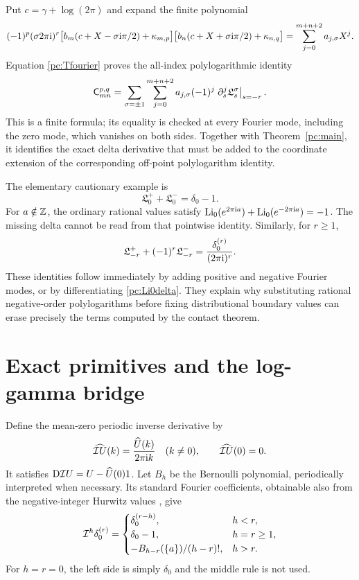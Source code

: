 Put $c=\gamma+\log(2\pi)$ and expand the finite polynomial
\begin{equation}\label{pc:polylogpolynomial}
 (-1)^p(\sigma2\pi\mathrm{i})^r
 \bigl[b_m(c+X-\sigma\mathrm{i}\pi/2)+\kappa_{m,p}\bigr]
 \bigl[b_n(c+X+\sigma\mathrm{i}\pi/2)+\kappa_{n,q}\bigr]
 =\sum_{j=0}^{m+n+2}a_{j,\sigma}X^j.
\end{equation}
Equation \eqref{pc:Tfourier} proves the all-index polylogarithmic identity
\begin{equation}\label{pc:polylogidentity}
 \mathsf C_{mn}^{p,q}=
 \sum_{\sigma=\pm1}\sum_{j=0}^{m+n+2}
 a_{j,\sigma}(-1)^j
 \left.\partial_s^j\mathfrak L_s^\sigma\right|_{s=-r}.
\end{equation}
This is a finite formula; its equality is checked at every Fourier mode, including the zero mode, which vanishes on both sides. Together with Theorem~\ref{pc:main}, it identifies the exact delta derivative that must be added to the coordinate extension of the corresponding off-point polylogarithm identity.

The elementary cautionary example is
\begin{equation}\label{pc:Li0delta}
 \mathfrak L_0^++\mathfrak L_0^-=\delta_0-1.
\end{equation}
For $a\notin\mathbb{Z}$, the ordinary rational values satisfy
$\operatorname{Li}_0(e^{2\pi\mathrm{i} a})+\operatorname{Li}_0(e^{-2\pi\mathrm{i} a})=-1$. The missing delta cannot be read from that pointwise identity. Similarly, for $r\ge1$,
\begin{equation}\label{pc:Lirdelta}
 \mathfrak L_{-r}^++(-1)^r\mathfrak L_{-r}^-
 =\frac{\delta_0^{(r)}}{(2\pi\mathrm{i})^r}.
\end{equation}
These identities follow immediately by adding positive and negative Fourier modes, or by differentiating \eqref{pc:Li0delta}. They explain why substituting rational negative-order polylogarithms before fixing distributional boundary values can erase precisely the terms computed by the contact theorem.

\section{Exact primitives and the log-gamma bridge}\label{pc:primitives}
Define the mean-zero periodic inverse derivative by
\[
 \widehat{\mathcal I U}(k)=\frac{\widehat U(k)}{2\pi\mathrm{i} k}\quad(k\ne0),
 \qquad\widehat{\mathcal I U}(0)=0.
\]
It satisfies $\mathrm D\mathcal I U=U-\widehat U(0)1$. Let $B_h$ be the Bernoulli polynomial, periodically interpreted when necessary. Its standard Fourier coefficients, obtainable also from the negative-integer Hurwitz values \cite{intdist:DLMFHurwitz}, give
\begin{equation}\label{pc:primitivecontact}
 \mathcal I^h\delta_0^{(r)}=
 \begin{cases}
 \delta_0^{(r-h)},&h<r,\\
 \delta_0-1,&h=r\ge1,\\
 -B_{h-r}(\{a\})/(h-r)!,&h>r.
 \end{cases}
\end{equation}
For $h=r=0$, the left side is simply $\delta_0$ and the middle rule is not used.

